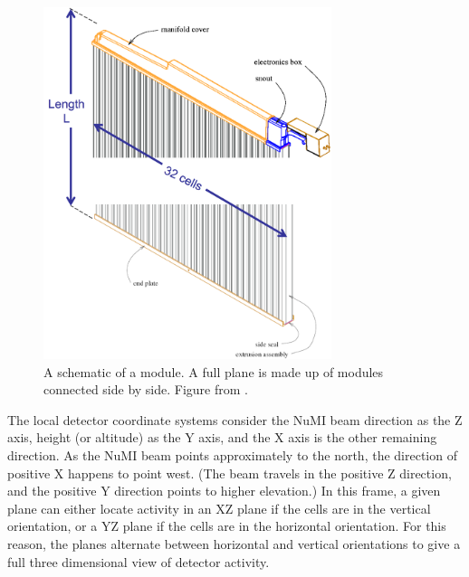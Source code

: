 \begin{figure}[htb]
  \centering
  \includegraphics[width=0.75\textwidth]{figures/DetModule.png}
  \caption[A Detector Module]{A schematic of a module. A full plane is made up of modules connected side by side. Figure from \cite{ref:TDRNOvA}.}
  \label{fig:DetModule}
\end{figure}

The local detector coordinate systems consider the NuMI beam direction as the Z axis, height (or altitude) as the Y axis, and the X axis is the other remaining direction. As the NuMI beam points approximately to the north, the direction of positive X happens to point west. (The beam travels in the positive Z direction, and the positive Y direction points to higher elevation.) In this frame, a given plane can either locate activity in an XZ plane if the cells are in the vertical orientation, or a YZ plane if the cells are in the horizontal orientation. For this reason, the planes alternate between horizontal and vertical orientations to give a full three dimensional view of detector activity.

